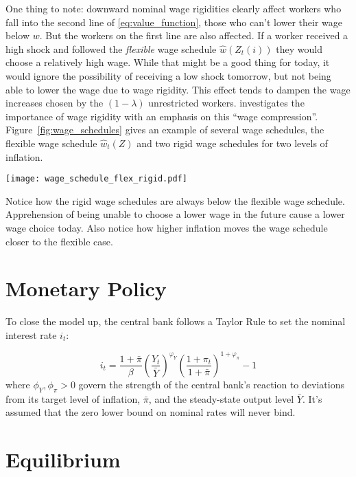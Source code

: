 \documentclass[12pt,a4paper]{scrartcl}            %
\begin{document}
One thing to note: downward nominal wage rigidities clearly affect workers who fall into the second line of \eqref{eq:value_function}, those who can't lower their wage below $w$.
But the workers on the first line are also affected.
If a worker received a high shock and followed the \emph{flexible} wage schedule $\hat{w}(Z_t(i))$ they would choose a relatively high wage.
While that might be a good thing for today, it would ignore the possibility of receiving a low shock tomorrow, but not being able to lower the wage due to wage rigidity.
This effect tends to dampen the wage increases chosen by the $(1 - \lambda)$ unrestricted workers.
\cite{elsby_2009} investigates the importance of wage rigidity with an emphasis on this ``wage compression''.
Figure~\ref{fig:wage_schedules} gives an example of several wage schedules, the flexible wage schedule $\hat{w}_t(Z)$ and two rigid wage schedules for two levels of inflation.

\begin{center}
  \noindent \texttt{[image: wage\_schedule\_flex\_rigid.pdf]}  %
  \label{fig:wage_schedules}
\end{center}
%
Notice how the rigid wage schedules are always below the flexible wage schedule.
Apprehension of being unable to choose a lower wage in the future cause a lower wage choice today.
Also notice how higher inflation moves the wage schedule closer to the flexible case.


\section{Monetary Policy}
\label{sec:monetary_policy}

To close the model up, the central bank follows a Taylor Rule to set the nominal interest rate $i_t$:

\begin{equation}
    \label{eq:taylor_rule}
    i_t = \frac{1 + \bar{\pi}}{\beta} \left( \frac{Y_t}{\bar{Y}} \right)^{\varphi_Y} \left( \frac{1 + \pi_t}{1 + \bar{\pi}} \right)^{1 + \varphi_{\pi}} - 1
\end{equation}
%
where $\phi_Y, \phi_{\pi} > 0$ govern the strength of the central bank's reaction to deviations from its target level of inflation, $\bar{\pi}$, and the steady-state output level $\bar{Y}$.
It's assumed that the zero lower bound on nominal rates will never bind.

\section{Equilibrium}
\label{sec:equilibrium}
\end{document}
